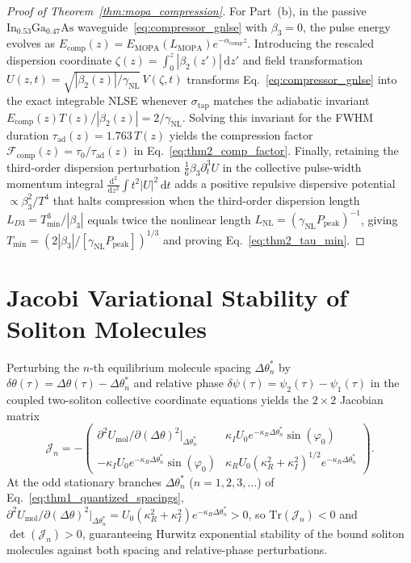 \documentclass[11pt,letterpaper]{article}
\begin{document}
\begin{proof}[Proof of Theorem~\ref{thm:mopa_compression}]
For Part~(b), in the passive $\mathrm{In}_{0.53}\mathrm{Ga}_{0.47}\mathrm{As}$ waveguide~\eqref{eq:compressor_gnlse} with $\beta_3 = 0$, the pulse energy evolves as $E_{\mathrm{comp}}(z) = E_{\mathrm{MOPA}}(L_{\mathrm{MOPA}})e^{-\alpha_{\mathrm{comp}} z}$. Introducing the rescaled dispersion coordinate $\zeta(z) = \int_0^z |\beta_2(z')|\,\mathrm{d}z'$ and field transformation $U(z, t) = \sqrt{|\beta_2(z)|/\gamma_{\mathrm{NL}}}\,V(\zeta, t)$ transforms Eq.~\eqref{eq:compressor_gnlse} into the exact integrable NLSE whenever $\sigma_{\mathrm{tap}}$ matches the adiabatic invariant $E_{\mathrm{comp}}(z) T(z) / |\beta_2(z)| = 2/\gamma_{\mathrm{NL}}$. Solving this invariant for the FWHM duration $\tau_{\mathrm{ad}}(z) = 1.763\,T(z)$ yields the compression factor $\mathcal{F}_{\mathrm{comp}}(z) = \tau_0/\tau_{\mathrm{ad}}(z)$ in Eq.~\eqref{eq:thm2_comp_factor}. Finally, retaining the third-order dispersion perturbation $\frac{1}{6}\beta_3 \partial_t^3 U$ in the collective pulse-width momentum integral $\frac{\mathrm{d}^2}{\mathrm{d}z^2}\int t^2 |U|^2\,\mathrm{d}t$ adds a positive repulsive dispersive potential $\propto \beta_3^2 / T^4$ that halts compression when the third-order dispersion length $L_{D3} = T_{\min}^3 / |\beta_3|$ equals twice the nonlinear length $L_{\mathrm{NL}} = (\gamma_{\mathrm{NL}} P_{\mathrm{peak}})^{-1}$, giving $T_{\min} = (2|\beta_3|/[\gamma_{\mathrm{NL}}P_{\mathrm{peak}}])^{1/3}$ and proving Eq.~\eqref{eq:thm2_tau_min}.
\end{proof}

\section{Jacobi Variational Stability of Soliton Molecules}
\label{app:molecule_stability}

Perturbing the $n$-th equilibrium molecule spacing $\Delta\theta_n^*$ by $\delta\theta(\tau) = \Delta\theta(\tau) - \Delta\theta_n^*$ and relative phase $\delta\psi(\tau) = \psi_2(\tau) - \psi_1(\tau)$ in the coupled two-soliton collective coordinate equations yields the $2\times 2$ Jacobian matrix
\begin{equation}
\mathcal{J}_n = -\begin{pmatrix}
\partial^2 U_{\mathrm{mol}}/\partial(\Delta\theta)^2|_{\Delta\theta_n^*} & \kappa_I U_0 e^{-\kappa_R \Delta\theta_n^*}\sin(\varphi_0) \\
-\kappa_I U_0 e^{-\kappa_R \Delta\theta_n^*}\sin(\varphi_0) & \kappa_R U_0 (\kappa_R^2 + \kappa_I^2)^{1/2} e^{-\kappa_R \Delta\theta_n^*}
\end{pmatrix}.
\label{eq:appC_jacobian}
\end{equation}
At the odd stationary branches $\Delta\theta_n^*$ ($n = 1, 2, 3, \dots$) of Eq.~\eqref{eq:thm1_quantized_spacings}, $\partial^2 U_{\mathrm{mol}}/\partial(\Delta\theta)^2|_{\Delta\theta_n^*} = U_0 (\kappa_R^2 + \kappa_I^2)e^{-\kappa_R \Delta\theta_n^*} > 0$, so $\mathrm{Tr}(\mathcal{J}_n) < 0$ and $\det(\mathcal{J}_n) > 0$, guaranteeing Hurwitz exponential stability of the bound soliton molecules against both spacing and relative-phase perturbations.
\end{document}
